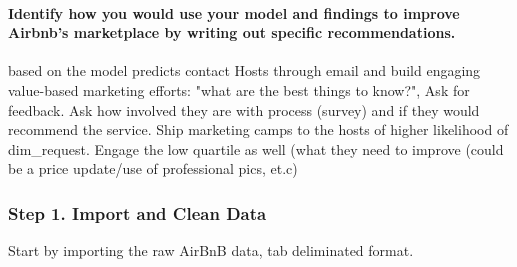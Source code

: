 \documentclass[11pt]{article}
\begin{document}
    \paragraph{Identify how you would use your model and findings to improve
Airbnb's marketplace by writing out specific
recommendations.}\label{identify-how-you-would-use-your-model-and-findings-to-improve-airbnbs-marketplace-by-writing-out-specific-recommendations.}

based on the model predicts contact Hosts through email and build
engaging value-based marketing efforts: "what are the best things to
know?", Ask for feedback. Ask how involved they are with process
(survey) and if they would recommend the service. Ship marketing camps
to the hosts of higher likelihood of dim\_request. Engage the low
quartile as well (what they need to improve (could be a price update/use
of professional pics, et.c)

    \subsubsection{Step 1. Import and Clean
Data}\label{step-1.-import-and-clean-data}

Start by importing the raw AirBnB data, tab deliminated format.
\end{document}
